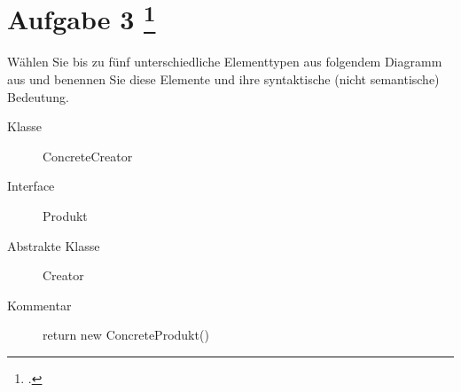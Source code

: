 \documentclass{lehramt-informatik-aufgabe}
\begin{document}
\section{Aufgabe 3
\footcite{66116:2021:03}}

Wählen Sie bis zu fünf unterschiedliche Elementtypen aus folgendem
Diagramm aus und benennen Sie diese Elemente und ihre syntaktische
(nicht semantische) Bedeutung.

\begin{liAntwort}
\begin{description}
\item[Klasse] ConcreteCreator
\item[Interface] Produkt
\item[Abstrakte Klasse]  Creator
\item[Kommentar] return new ConcreteProdukt()
\end{description}
\end{liAntwort}
\end{document}
